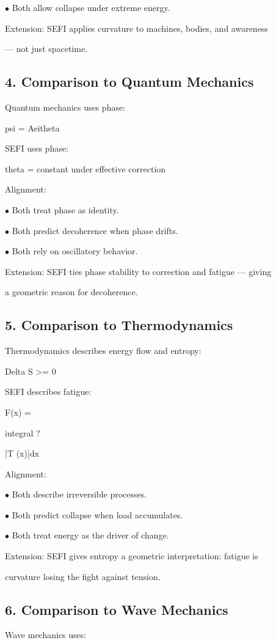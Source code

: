 \documentclass[10pt]{article}
\begin{document}
\noindent $\bullet$ Both allow collapse under extreme energy.

Extension: SEFI applies curvature to machines, bodies, and awareness

--- not just spacetime.


\subsection*{4. Comparison to Quantum Mechanics}
Quantum mechanics uses phase:

psi = Aeitheta

SEFI uses phase:

theta = constant under effective correction

Alignment:

\noindent $\bullet$ Both treat phase as identity.

\noindent $\bullet$ Both predict decoherence when phase drifts.

\noindent $\bullet$ Both rely on oscillatory behavior.

Extension: SEFI ties phase stability to correction and fatigue --- giving

a geometric reason for decoherence.

\subsection*{5. Comparison to Thermodynamics}
Thermodynamics describes energy flow and entropy:

Delta S >= 0

SEFI describes fatigue:

F(x) =

integral ?

|T (x)|dx

Alignment:

\noindent $\bullet$ Both describe irreversible processes.

\noindent $\bullet$ Both predict collapse when load accumulates.

\noindent $\bullet$ Both treat energy as the driver of change.

Extension: SEFI gives entropy a geometric interpretation: fatigue is

curvature losing the fight against tension.


\subsection*{6. Comparison to Wave Mechanics}
Wave mechanics uses:
\end{document}
